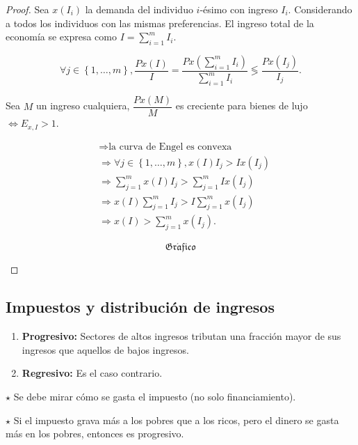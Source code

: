 \documentclass{report}
\newcommand{\GRAF}{\begin{center}$$\mathfrak{Gr\acute{a}fico}$$\end{center}}
\newenvironment{obs}{$\star$ }{}
\begin{document}
\begin{proof}
Sea $x\!\left(I_i\right)$ la demanda del individuo $i$-ésimo con ingreso $I_i$. Considerando a todos los individuos con las mismas preferencias. El ingreso total de la economía se expresa como $I = \displaystyle{\sum_{i=1}^{m}} I_i$.

$$
\forall j\in\left\{1,\ldots,m\right\},\frac{Px\!\left(I\right)}{I} = \frac{Px\!\left(\displaystyle{\sum_{i=1}^{m}}I_i\right)}{\displaystyle{\sum_{i=1}^{m}}I_i} \lessgtr \frac{Px\!\left(I_j\right)}{I_j}\text{.}
$$

Sea $M$ un ingreso cualquiera, $\dfrac{Px\!\left(M\right)}{M}$ es creciente para bienes de lujo $\Leftrightarrow E_{x,I} > 1$.

\begin{align*}
    &\Rightarrow \text{la curva de Engel es convexa}\\
    &\Rightarrow \forall j\in\left\{1,\ldots,m\right\}, x\!\left(I\right)I_j > Ix\!\left(I_j\right)\\
    &\Rightarrow \sum_{j=1}^{m}x\!\left(I\right)I_j > \sum_{j=1}^{m} I x\!\left(I_j\right)\\
    &\Rightarrow x\!\left(I\right)\sum_{j=1}^{m} I_j > I \sum_{j=1}^{m} x\!\left(I_j\right)\\
    &\Rightarrow x\!\left(I\right) > \sum_{j=1}^{m} x\!\left(I_j\right)\text{.}
\end{align*}

\GRAF
\end{proof}

\subsection{Impuestos y distribución de ingresos}

\begin{enumerate}
\item \textbf{Progresivo:} Sectores de altos ingresos tributan una fracción mayor de sus ingresos que aquellos de bajos ingresos.
\item \textbf{Regresivo:} Es el caso contrario.
\end{enumerate}

\begin{obs}
Se debe mirar cómo se gasta el impuesto (no solo financiamiento).
\end{obs}

\begin{obs}
Si el impuesto grava más a los pobres que a los ricos, pero el dinero se gasta más en los pobres, entonces es progresivo.
\end{obs}
\end{document}
